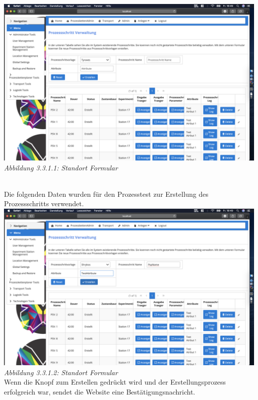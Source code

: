\documentclass[enabledeprecatedfontcommands,fontsize=12pt,paper=a4,twoside]{scrartcl}
\begin{document}
\hypertarget{sc3.3.1.1}{
\includegraphics[width=1\textwidth]{Screenshots/33pspFormular.png}
\textit{Abbildung 3.3.1.1: Standort Formular}
} \\

Die folgenden Daten wurden für den Prozesstest zur Erstellung des Prozessschritts verwendet.\\

\hypertarget{sc3.3.1.2}{
\includegraphics[width=1\textwidth]{Screenshots/33DataFakePsp.png}
\textit{Abbildung 3.3.1.2: Standort Formular}
} \\
Wenn die Knopf zum Erstellen gedrückt wird und der Erstellungsprozess erfolgreich war, sendet die Website eine Bestätigungsnachricht.\\
\end{document}
